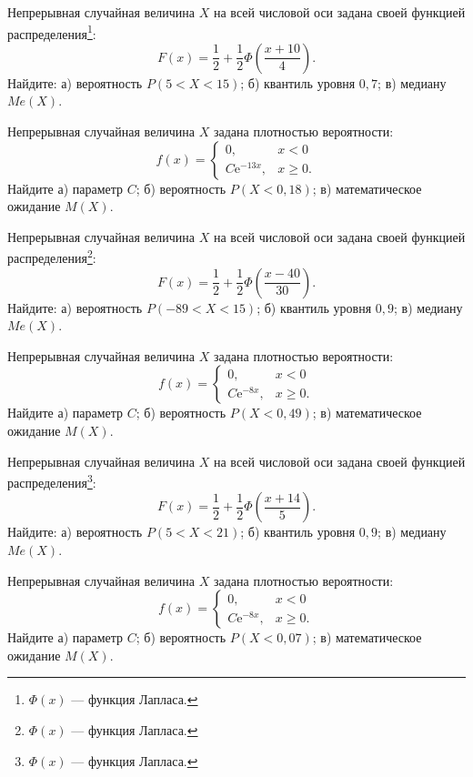 \vfill

\newpage\setcounter{zad}{0}

\z Непрерывная случайная величина $X$ на всей числовой оси задана своей функцией распределения\footnote{$\Phi(x)$ --- функция Лапласа.}: $$ F(x) = \frac{1}{2} + \frac{1}{2}\Phi\left( \frac{x + 10}{4} \right). $$ Найдите: а) вероятность $P(5 < X < 15)$; б) квантиль уровня $0{,}7$; в) медиану $Me(X)$.


\vfill

\z Непрерывная случайная величина $X$ задана плотностью вероятности: $$ f(x) = \begin{cases}0, & x < 0 \\ C\mathrm{e}^{-13x}, & x \geqslant 0.\end{cases} $$ Найдите а) параметр $C$; б) вероятность $P(X < 0{,}18)$; в) математическое ожидание $M(X)$.
 

\vfill

\newpage\setcounter{zad}{0}

\z Непрерывная случайная величина $X$ на всей числовой оси задана своей функцией распределения\footnote{$\Phi(x)$ --- функция Лапласа.}: $$ F(x) = \frac{1}{2} + \frac{1}{2}\Phi\left( \frac{x - 40}{30} \right). $$ Найдите: а) вероятность $P(-89 < X < 15)$; б) квантиль уровня $0{,}9$; в) медиану $Me(X)$.


\vfill

\z Непрерывная случайная величина $X$ задана плотностью вероятности: $$ f(x) = \begin{cases}0, & x < 0 \\ C\mathrm{e}^{-8x}, & x \geqslant 0.\end{cases} $$ Найдите а) параметр $C$; б) вероятность $P(X < 0{,}49)$; в) математическое ожидание $M(X)$.
 

\vfill

\newpage\setcounter{zad}{0}

\z Непрерывная случайная величина $X$ на всей числовой оси задана своей функцией распределения\footnote{$\Phi(x)$ --- функция Лапласа.}: $$ F(x) = \frac{1}{2} + \frac{1}{2}\Phi\left( \frac{x + 14}{5} \right). $$ Найдите: а) вероятность $P(5 < X < 21)$; б) квантиль уровня $0{,}9$; в) медиану $Me(X)$.


\vfill

\z Непрерывная случайная величина $X$ задана плотностью вероятности: $$ f(x) = \begin{cases}0, & x < 0 \\ C\mathrm{e}^{-8x}, & x \geqslant 0.\end{cases} $$ Найдите а) параметр $C$; б) вероятность $P(X < 0{,}07)$; в) математическое ожидание $M(X)$.
 

